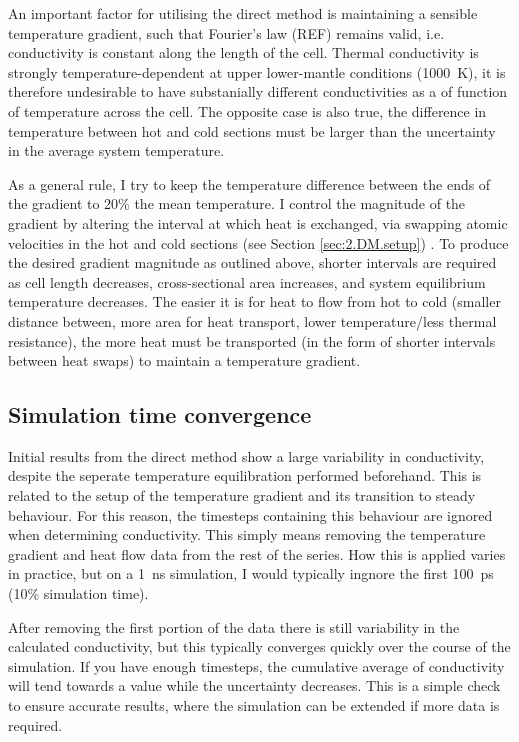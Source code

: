 An important factor for utilising the direct method is maintaining a sensible temperature gradient, such that Fourier's law (REF) remains valid, i.e. conductivity is constant along the length of the cell. Thermal conductivity is strongly temperature-dependent at upper lower-mantle conditions (1000~K), it is therefore undesirable to have substanially different conductivities as a of function of temperature across the cell. The opposite case is also true, the difference in temperature between hot and cold sections must be larger than the uncertainty in the average system temperature. 

As a general rule, I try to keep the temperature difference between the ends of the gradient to 20\% the mean temperature. I control the magnitude of the gradient by altering the interval at which heat is exchanged, via swapping atomic velocities in the hot and cold sections (see Section \ref{sec:2.DM.setup}) . To produce the desired gradient magnitude as outlined above, shorter intervals are required as cell length decreases, cross-sectional area increases, and system equilibrium temperature decreases. The easier it is for heat to flow from hot to cold (smaller distance between, more area for heat transport, lower temperature/less thermal resistance), the more heat must be transported (in the form of shorter intervals between heat swaps) to maintain a temperature gradient.


\subsection{\label{sec:3.DM.time}Simulation time convergence}

Initial results from the direct method show a large variability in conductivity, despite the seperate temperature equilibration performed beforehand. This is related to the setup of the temperature gradient and its transition to steady behaviour. For this reason, the timesteps containing this behaviour are ignored when determining conductivity. This simply means removing the temperature gradient and heat flow data from the rest of the series. How this is applied varies in practice, but on a 1~ns simulation, I would typically ingnore the first 100~ps (10\% simulation time).

After removing the first portion of the data there is still variability in the calculated conductivity, but this typically converges quickly over the course of the simulation. If you have enough timesteps, the cumulative average of conductivity will tend towards a value while the uncertainty decreases. This is a simple check to ensure accurate results, where the simulation can be extended if more data is required.

